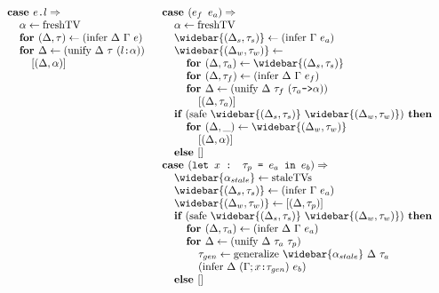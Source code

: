 \documentclass[acmsmall]{acmart}
\begin{document}
\begin{figure*}[h]
\[\begin{array}[t]{@{} l}
    \I \B{case } \code{$e$.$l$} \Rightarrow  
    \\
    \I\I \alpha \leftarrow \F{freshTV}
    \\
    \I\I \B{for } (\Delta, \tau) \leftarrow (\F{infer } \Delta\ \Gamma\ e)
    \\
    \I\I \B{for } \Delta \leftarrow (\F{unify } \Delta\ \tau\ (\code{$l$:$\alpha$}))
    \\
    \I\I\I [(\Delta, \alpha)]
\end{array}
\begin{array}[t]{@{} l}
    \I \B{case } (\code{$e_f$ $e_a$}) \Rightarrow  
    \\
    \I\I \alpha \leftarrow \F{freshTV}
    \\
    \I\I \widebar{(\Delta_s, \tau_s)} \leftarrow (\F{infer } \Gamma\ e_a)
    \\
    \I\I \widebar{(\Delta_w, \tau_w)} \leftarrow
    \\
    \I\I\I \B{for } (\Delta, \tau_a) \leftarrow \widebar{(\Delta_s, \tau_s)}
    \\
    \I\I\I \B{for } (\Delta, \tau_f) \leftarrow (\F{infer } \Delta\ \Gamma\ e_f)
    \\
    \I\I\I \B{for } \Delta \leftarrow (\F{unify } \Delta\ \tau_f\ (\code{$\tau_a$->$\alpha$}))
    \\
    \I\I\I\I [(\Delta, \tau_a)]
    \\
    \I\I \B{if } (\F{safe } \widebar{(\Delta_s, \tau_s)}\ \widebar{(\Delta_w, \tau_w)} ) \B{ then }
    \\
    \I\I\I \B{for } (\Delta, \_) \leftarrow \widebar{(\Delta_w, \tau_w)}
    \\
    \I\I\I\I [(\Delta, \alpha)]
    \\
    \I\I \B{else } [] 

    \\

    \I \B{case } (\code{let $x$ : $\tau_p$ = $e_a$ in $e_b$}) \Rightarrow  
    \\
    \I\I \widebar{\alpha_{stale}} \leftarrow \F{staleTVs}
    \\
    \I\I \widebar{(\Delta_s, \tau_s)} \leftarrow (\F{infer } \Gamma\ e_a)
    \\
    \I\I \widebar{(\Delta_w, \tau_w)} \leftarrow [(\Delta, \tau_p)]
    \\
    \I\I \B{if } (\F{safe } \widebar{(\Delta_s, \tau_s)}\ \widebar{(\Delta_w, \tau_w)} ) \B{ then }
    \\
    \I\I\I \B{for } (\Delta, \tau_a) \leftarrow (\F{infer } \Delta\ \Gamma\ e_a)
    \\
    \I\I\I \B{for } \Delta \leftarrow (\F{unify } \Delta\ \tau_a\ \tau_p)
    \\
    \I\I\I\I \tau_{gen} \leftarrow \F{generalize } \widebar{\alpha_{stale}}\ \Delta\ \tau_a
    \\
    \I\I\I\I (\F{infer } \Delta\ (\Gamma;\code{$x$:$\tau_{gen}$})\ e_b)
    \\
    \I\I \B{else } [] 


\end{array}\]
\end{figure*}
\end{document}
